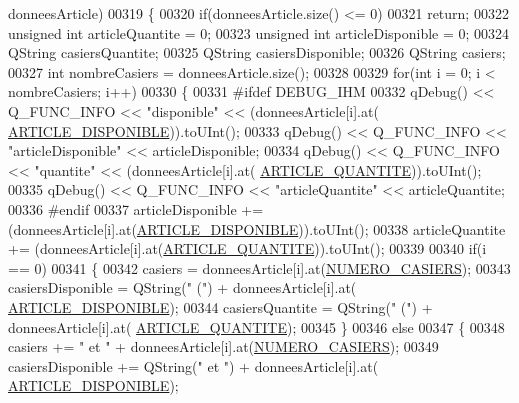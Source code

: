 \begin{DoxyCode}
      donneesArticle)
00319 \{
00320     \textcolor{keywordflow}{if}(donneesArticle.size() <= 0)
00321         \textcolor{keywordflow}{return};
00322     \textcolor{keywordtype}{unsigned} \textcolor{keywordtype}{int} articleQuantite = 0;
00323     \textcolor{keywordtype}{unsigned} \textcolor{keywordtype}{int} articleDisponible = 0;
00324     QString casiersQuantite;
00325     QString casiersDisponible;
00326     QString casiers;
00327     \textcolor{keywordtype}{int} nombreCasiers = donneesArticle.size();
00328 
00329     \textcolor{keywordflow}{for}(\textcolor{keywordtype}{int} i = 0; i < nombreCasiers; i++)
00330     \{
00331 \textcolor{preprocessor}{        #ifdef DEBUG\_IHM}
00332             qDebug() << Q\_FUNC\_INFO << \textcolor{stringliteral}{"disponible"} << (donneesArticle[i].at(
      \hyperlink{_ihm_8h_a2c5f129a41ff7dac8fa0d97af2d1efd5}{ARTICLE\_DISPONIBLE})).toUInt();
00333             qDebug() << Q\_FUNC\_INFO << \textcolor{stringliteral}{"articleDisponible"} << articleDisponible;
00334             qDebug() << Q\_FUNC\_INFO << \textcolor{stringliteral}{"quantite"} << (donneesArticle[i].at(
      \hyperlink{_ihm_8h_ac91f014239536b9bb49d4265ca91d0d5}{ARTICLE\_QUANTITE})).toUInt();
00335             qDebug() << Q\_FUNC\_INFO << \textcolor{stringliteral}{"articleQuantite"} << articleQuantite;
00336 \textcolor{preprocessor}{        #endif}
00337         articleDisponible += (donneesArticle[i].at(\hyperlink{_ihm_8h_a2c5f129a41ff7dac8fa0d97af2d1efd5}{ARTICLE\_DISPONIBLE})).toUInt();
00338         articleQuantite += (donneesArticle[i].at(\hyperlink{_ihm_8h_ac91f014239536b9bb49d4265ca91d0d5}{ARTICLE\_QUANTITE})).toUInt();
00339 
00340         \textcolor{keywordflow}{if}(i == 0)
00341         \{
00342             casiers = donneesArticle[i].at(\hyperlink{_ihm_8h_a7935787ef2fa7206f347feff73167ce6}{NUMERO\_CASIERS});
00343             casiersDisponible = QString(\textcolor{stringliteral}{" ("}) + donneesArticle[i].at(
      \hyperlink{_ihm_8h_a2c5f129a41ff7dac8fa0d97af2d1efd5}{ARTICLE\_DISPONIBLE});
00344             casiersQuantite = QString(\textcolor{stringliteral}{" ("}) + donneesArticle[i].at(
      \hyperlink{_ihm_8h_ac91f014239536b9bb49d4265ca91d0d5}{ARTICLE\_QUANTITE});
00345         \}
00346         \textcolor{keywordflow}{else}
00347         \{
00348             casiers += \textcolor{stringliteral}{" et "} + donneesArticle[i].at(\hyperlink{_ihm_8h_a7935787ef2fa7206f347feff73167ce6}{NUMERO\_CASIERS});
00349             casiersDisponible += QString(\textcolor{stringliteral}{" et "}) + donneesArticle[i].at(
      \hyperlink{_ihm_8h_a2c5f129a41ff7dac8fa0d97af2d1efd5}{ARTICLE\_DISPONIBLE});

\end{DoxyCode}
